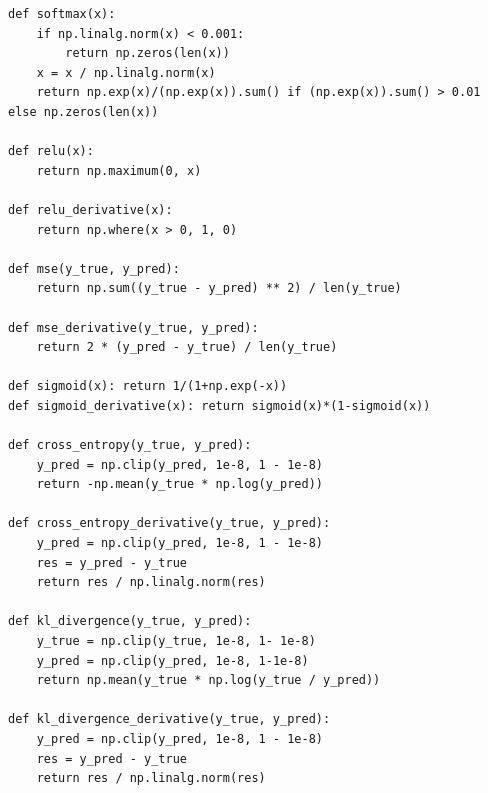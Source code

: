 \documentclass[a4paper, 14pt]{extarticle}
\begin{document}
\begin{lstlisting}[language={},caption={Определение функций активации и функций ошибки},label={lst:code2}, breaklines=true]
def softmax(x):
    if np.linalg.norm(x) < 0.001:
        return np.zeros(len(x))
    x = x / np.linalg.norm(x)
    return np.exp(x)/(np.exp(x)).sum() if (np.exp(x)).sum() > 0.01 else np.zeros(len(x))

def relu(x):
    return np.maximum(0, x)

def relu_derivative(x):
    return np.where(x > 0, 1, 0)

def mse(y_true, y_pred):
    return np.sum((y_true - y_pred) ** 2) / len(y_true)

def mse_derivative(y_true, y_pred):
    return 2 * (y_pred - y_true) / len(y_true)

def sigmoid(x): return 1/(1+np.exp(-x))
def sigmoid_derivative(x): return sigmoid(x)*(1-sigmoid(x))

def cross_entropy(y_true, y_pred):
    y_pred = np.clip(y_pred, 1e-8, 1 - 1e-8)
    return -np.mean(y_true * np.log(y_pred))

def cross_entropy_derivative(y_true, y_pred):
    y_pred = np.clip(y_pred, 1e-8, 1 - 1e-8)
    res = y_pred - y_true
    return res / np.linalg.norm(res)

def kl_divergence(y_true, y_pred):
    y_true = np.clip(y_true, 1e-8, 1- 1e-8)
    y_pred = np.clip(y_pred, 1e-8, 1-1e-8)
    return np.mean(y_true * np.log(y_true / y_pred))

def kl_divergence_derivative(y_true, y_pred):
    y_pred = np.clip(y_pred, 1e-8, 1 - 1e-8)
    res = y_pred - y_true
    return res / np.linalg.norm(res)
\end{lstlisting}
\end{document}
